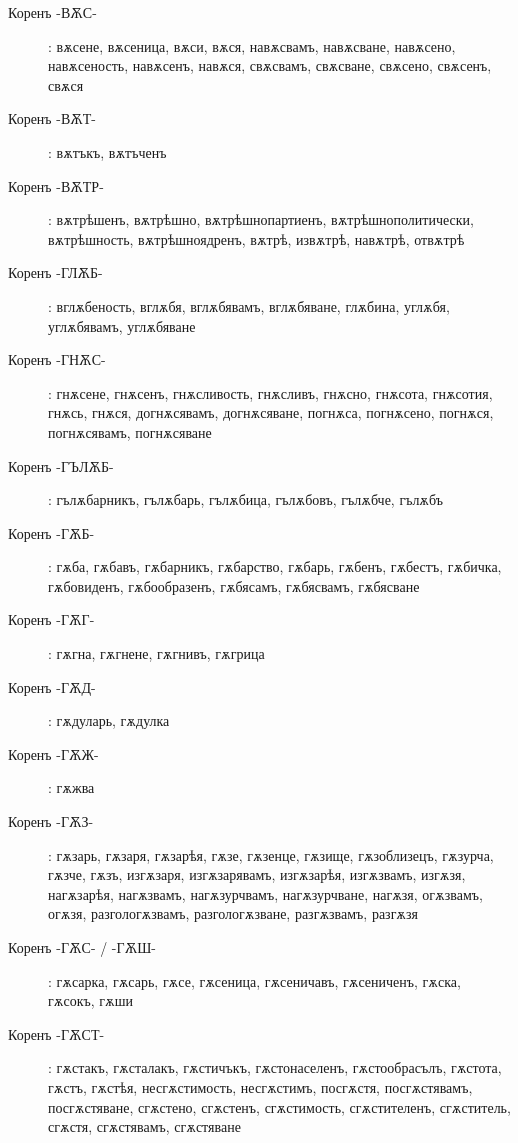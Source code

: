 \documentclass{article}
\begin{document}
\begin{description}
		\item[Коренъ -ВѪС-]: вѫсене, вѫсеница, вѫси, вѫся, навѫсвамъ, навѫсване, навѫсено, навѫсеность, навѫсенъ, навѫся, свѫсвамъ, свѫсване, свѫсено, свѫсенъ, свѫся
		
		\item[Коренъ -ВѪТ-]: вѫтъкъ, вѫтъченъ
		
		\item[Коренъ -ВѪТР-]: вѫтрѣшенъ, вѫтрѣшно, вѫтрѣшнопартиенъ, вѫтрѣшнополитически, вѫтрѣшность, вѫтрѣшноядренъ, вѫтрѣ, извѫтрѣ, навѫтрѣ, отвѫтрѣ
		
		\item[Коренъ -ГЛѪБ-]: вглѫбеность, вглѫбя, вглѫбявамъ, вглѫбяване, глѫбина, углѫбя, углѫбявамъ, углѫбяване
		
		\item[Коренъ -ГНѪС-]: гнѫсене, гнѫсенъ, гнѫсливость, гнѫсливъ, гнѫсно, гнѫсота, гнѫсотия, гнѫсь, гнѫся, догнѫсявамъ, догнѫсяване, погнѫса, погнѫсено, погнѫся, погнѫсявамъ, погнѫсяване
		
		\item[Коренъ -ГЪЛѪБ-]: гълѫбарникъ, гълѫбарь, гълѫбица, гълѫбовъ, гълѫбче, гълѫбъ
		
		\item[Коренъ -ГѪБ-]: гѫба, гѫбавъ, гѫбарникъ, гѫбарство, гѫбарь, гѫбенъ, гѫбестъ, гѫбичка, гѫбовиденъ, гѫбообразенъ, гѫбясамъ, гѫбясвамъ, гѫбясване
		
		\item[Коренъ -ГѪГ-]: гѫгна, гѫгнене, гѫгнивъ, гѫгрица
		
		\item[Коренъ -ГѪД-]: гѫдуларь, гѫдулка
		
		\item[Коренъ -ГѪЖ-]: гѫжва
		
		\item[Коренъ -ГѪЗ-]: гѫзарь, гѫзаря, гѫзарѣя, гѫзе, гѫзенце, гѫзище, гѫзоблизецъ, гѫзурча, гѫзче, гѫзъ, изгѫзаря, изгѫзарявамъ, изгѫзарѣя, изгѫзвамъ, изгѫзя, нагѫзарѣя, нагѫзвамъ, нагѫзурчвамъ, нагѫзурчване, нагѫзя, огѫзвамъ, огѫзя, разгологѫзвамъ, разгологѫзване, разгѫзвамъ, разгѫзя
		
		\item[Коренъ -ГѪС- / -ГѪШ-]: гѫсарка, гѫсарь, гѫсе, гѫсеница, гѫсеничавъ, гѫсениченъ, гѫска, гѫсокъ, гѫши
		
		\item[Коренъ -ГѪСТ-]: гѫстакъ, гѫсталакъ, гѫстичъкъ, гѫстонаселенъ, гѫстообрасълъ, гѫстота, гѫстъ, гѫстѣя, несгѫстимость, несгѫстимъ, посгѫстя, посгѫстявамъ, посгѫстяване, сгѫстено, сгѫстенъ, сгѫстимость, сгѫстителенъ, сгѫститель, сгѫстя, сгѫстявамъ, сгѫстяване
		

\end{description}
\end{document}
